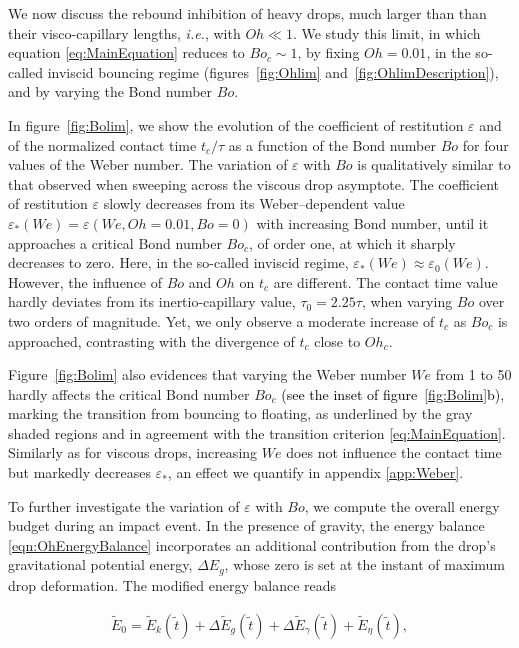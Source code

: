 \documentclass{jfm}
\newcommand{\Ohn}{\mathit{Oh}}
\newcommand{\Ohc}{\mathit{Oh}_\mathit{c}}
\newcommand{\Wen}{\mathit{We}}
\newcommand{\Bon}{\mathit{Bo}}
\newcommand{\Boc}{\mathit{Bo}_\mathit{c}}
\newcommand{\revRev}[1]{\textcolor{black}{#1}}
\begin{document}
We now discuss the rebound inhibition of heavy drops, much larger than than their visco-capillary lengths, {\it i.e.}, with $\Ohn \ll 1$. We study this limit, in which equation \eqref{eq:MainEquation} reduces to $\Boc \sim 1$, by fixing $\Ohn = 0.01$, in the so-called inviscid bouncing regime (figures~\ref{fig:Ohlim} and~\ref{fig:OhlimDescription}), and by varying the Bond number $\Bon$. 

In figure~\ref{fig:Bolim}, we show the evolution of the coefficient of restitution $\varepsilon$ and of the normalized contact time $t_c/\tau$ as a function of the Bond number $\Bon$ for four values of the Weber number.
The variation of $\varepsilon$ with $Bo$ is qualitatively similar to that observed when sweeping across the viscous drop asymptote.
The coefficient of restitution $\varepsilon$ slowly decreases from its Weber--dependent value $\varepsilon_*(\Wen) = \varepsilon(\Wen,\Ohn = 0.01,\Bon = 0)$ with increasing Bond number, until it approaches a critical Bond number $\Boc$, of order one, at which it sharply decreases to zero.
Here, in the so-called inviscid regime, $\varepsilon_*(\Wen) \approx \varepsilon_0(\Wen)$. However, the influence of $\Bon$ and $\Ohn$ on $t_c$ are different. The contact time value hardly deviates from its inertio-capillary value, $\tau_0 = 2.25 \tau$, when varying $\Bon$ over two orders of magnitude. Yet, we only observe a moderate increase of $t_c$ as $\Boc$ is approached, contrasting with the divergence of $t_c$ close to $\Ohc$.

Figure~\ref{fig:Bolim} also evidences that varying the Weber number $\Wen$ from 1 to 50 hardly affects the critical Bond number $\Boc$ \revRev{(see the inset of figure~\ref{fig:Bolim}b)}, marking the transition from bouncing to floating, as underlined by the gray shaded regions and in agreement with the transition criterion \eqref{eq:MainEquation}. Similarly as for viscous drops, increasing $\Wen$ does not influence the contact time but markedly decreases $\varepsilon_*$, an effect we quantify in appendix \ref{app:Weber}.

To further investigate the variation of $\varepsilon$ with $\Bon$, we compute the overall energy budget during an impact event. In the presence of gravity, the energy balance \eqref{eqn:OhEnergyBalance} incorporates an additional contribution from the drop's gravitational potential energy, $\Delta E_g$, whose zero is set at the instant of maximum drop deformation. The modified energy balance reads

\begin{align}
	\label{eqn:BoEnergyBalance}
	\tilde{E}_0 = \tilde{E}_k(\tilde{t}) + \Delta\tilde{E}_g(\tilde{t}) + \Delta\tilde{E}_\gamma(\tilde{t}) + \tilde{E}_\eta(\tilde{t}),
\end{align}
\end{document}
